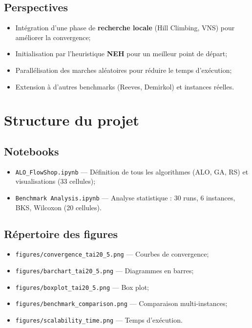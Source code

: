 \documentclass[12pt,a4paper,twoside]{report}
\begin{document}
\section{Perspectives}

\begin{itemize}
    \item Intégration d'une phase de \textbf{recherche locale} (Hill Climbing, VNS) pour améliorer la convergence;
    \item Initialisation par l'heuristique \textbf{NEH} \cite{nawaz1983} pour un meilleur point de départ;
    \item Parallélisation des marches aléatoires pour réduire le temps d'exécution;
    \item Extension à d'autres benchmarks (Reeves, Demirkol) et instances réelles.
\end{itemize}

\printbibliography

\appendix

\chapter{Structure du projet}

\section{Notebooks}

\begin{itemize}
    \item \texttt{ALO\_FlowShop.ipynb} --- Définition de tous les algorithmes (ALO, GA, RS) et visualisations (33 cellules);
    \item \texttt{Benchmark Analysis.ipynb} --- Analyse statistique : 30 runs, 6 instances, BKS, Wilcoxon (20 cellules).
\end{itemize}

\section{Répertoire des figures}

\begin{itemize}
    \item \texttt{figures/convergence\_tai20\_5.png} --- Courbes de convergence;
    \item \texttt{figures/barchart\_tai20\_5.png} --- Diagrammes en barres;
    \item \texttt{figures/boxplot\_tai20\_5.png} --- Box plot;
    \item \texttt{figures/benchmark\_comparison.png} --- Comparaison multi-instances;
    \item \texttt{figures/scalability\_time.png} --- Temps d'exécution.
\end{itemize}
\end{document}
